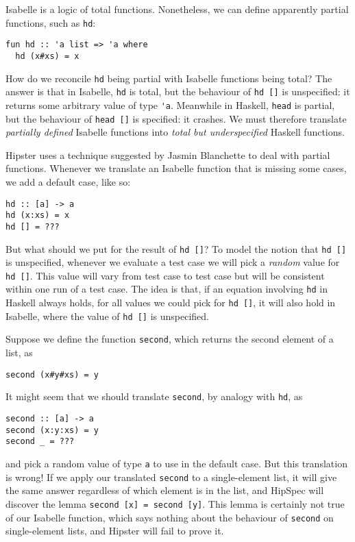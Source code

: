 Isabelle is a logic of total functions. Nonetheless, we can define
apparently partial functions, such as \verb|hd|:
\begin{verbatim}
fun hd :: 'a list => 'a where
  hd (x#xs) = x
\end{verbatim}

How do we reconcile \verb|hd| being partial with Isabelle functions
being total? The answer is that in Isabelle, \verb|hd| is total, but
the behaviour of \verb|hd []| is unspecified: it returns some
arbitrary value of type \verb|'a|. Meanwhile in Haskell, \verb|head|
is partial, but the behaviour of \verb|head []| is specified: it
crashes. We must therefore translate \emph{partially defined} Isabelle
functions into \emph{total but underspecified} Haskell functions.

Hipster uses a technique suggested by Jasmin Blanchette
\cite{blanchettification} to deal with partial functions. Whenever we translate an Isabelle function
that is missing some cases, we add a default case, like so:
\begin{verbatim}
hd :: [a] -> a
hd (x:xs) = x
hd [] = ???
\end{verbatim}

But what should we put for the result of \verb|hd []|? To model the
notion that \verb|hd []| is unspecified, whenever we evaluate a test
case we will pick a \emph{random} value for \verb|hd []|. This value
will vary from test case to test case but will be consistent within
one run of a test case. The idea is that, if an equation involving
\verb|hd| in Haskell always holds, for all values we could pick for \verb|hd []|,
it will also hold in Isabelle, where the value of \verb|hd []| is unspecified.

Suppose we define the function \verb|second|, which returns the second
element of a list, as
\begin{verbatim}
second (x#y#xs) = y
\end{verbatim}
It might seem that we should translate \verb|second|, by analogy with \verb|hd|, as
\begin{verbatim}
second :: [a] -> a
second (x:y:xs) = y
second _ = ???
\end{verbatim}
and pick a random value of type \verb|a| to use in the default case.
But this translation is wrong! If we apply our translated \verb|second|
to a single-element list, it will give the same answer regardless of which
element is in the list, and HipSpec will discover the lemma
\verb|second [x] = second [y]|. This lemma is certainly not true of our
Isabelle function, which says nothing about the behaviour
of \verb|second| on single-element lists, and Hipster will fail to
prove it.

